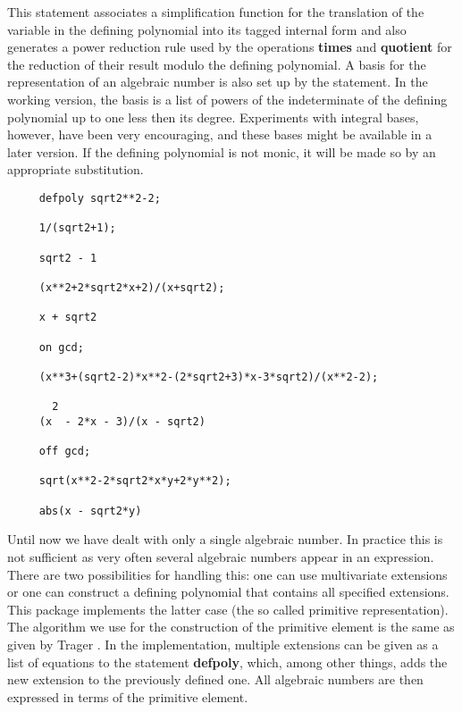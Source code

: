This statement associates a simplification function for the
translation of the variable in the defining polynomial into its tagged
internal form and also generates a power reduction rule used by the
operations {\bf times} and {\bf quotient} for the reduction of their
result modulo the defining polynomial.  A basis for the representation
of an algebraic number is also set up by the statement.  In the
working version, the basis is a list of powers of the indeterminate of
the defining polynomial up to one less then its degree.  Experiments
with integral bases, however, have been very encouraging, and these
bases might be available in a later version.  If the defining
polynomial is not monic, it will be made so by an appropriate
substitution.

\example {}

\begin{verbatim}
     defpoly sqrt2**2-2;

     1/(sqrt2+1);

     sqrt2 - 1

     (x**2+2*sqrt2*x+2)/(x+sqrt2);

     x + sqrt2

     on gcd;

     (x**3+(sqrt2-2)*x**2-(2*sqrt2+3)*x-3*sqrt2)/(x**2-2);

       2
     (x  - 2*x - 3)/(x - sqrt2)

     off gcd;

     sqrt(x**2-2*sqrt2*x*y+2*y**2);

     abs(x - sqrt2*y)
\end{verbatim}

Until now we have dealt with only a single algebraic number.  In practice
this is not sufficient as very often several algebraic numbers appear in an
expression.  There are two possibilities for handling this: one can use
multivariate extensions \cite{Davenport:81} or one can construct a defining
polynomial that contains all specified extensions.  This package implements
the latter case (the so called primitive representation).  The algorithm we
use for the construction of the primitive element is the same as given by
Trager \cite{Trager:76}.  In the implementation, multiple extensions can be
given as a list of equations to the statement {\bf defpoly}, which, among other
things, adds the new extension to the previously defined one.  All
algebraic numbers are then expressed in terms of the primitive element.


\example{}

